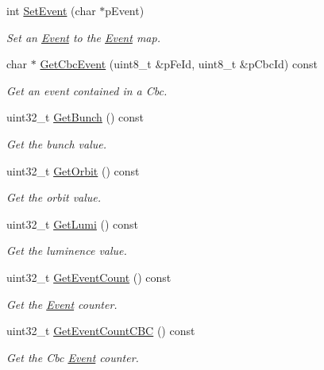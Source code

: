 \begin{DoxyCompactItemize}
int \hyperlink{class_ph2___hw_interface_1_1_event_a67bf8cfaeaec158907932be40b37601d}{Set\-Event} (char $\ast$p\-Event)
\begin{DoxyCompactList}\small\item\em Set an \hyperlink{class_ph2___hw_interface_1_1_event}{Event} to the \hyperlink{class_ph2___hw_interface_1_1_event}{Event} map. \end{DoxyCompactList}\item 
char $\ast$ \hyperlink{class_ph2___hw_interface_1_1_event_a2ee5e2552a84cb78ae902436e0dd77f4}{Get\-Cbc\-Event} (uint8\-\_\-t \&p\-Fe\-Id, uint8\-\_\-t \&p\-Cbc\-Id) const 
\begin{DoxyCompactList}\small\item\em Get an event contained in a Cbc. \end{DoxyCompactList}\item 
uint32\-\_\-t \hyperlink{class_ph2___hw_interface_1_1_event_ab577a18ce8a9edc17debb67ea8734530}{Get\-Bunch} () const 
\begin{DoxyCompactList}\small\item\em Get the bunch value. \end{DoxyCompactList}\item 
uint32\-\_\-t \hyperlink{class_ph2___hw_interface_1_1_event_a02d8bec5f5249cb80e2835e8aff037d7}{Get\-Orbit} () const 
\begin{DoxyCompactList}\small\item\em Get the orbit value. \end{DoxyCompactList}\item 
uint32\-\_\-t \hyperlink{class_ph2___hw_interface_1_1_event_ae5af75e033d2eb6d76a039e859a9ce86}{Get\-Lumi} () const 
\begin{DoxyCompactList}\small\item\em Get the luminence value. \end{DoxyCompactList}\item 
uint32\-\_\-t \hyperlink{class_ph2___hw_interface_1_1_event_aaebf08f816e8a98f424ba8ab25e32231}{Get\-Event\-Count} () const 
\begin{DoxyCompactList}\small\item\em Get the \hyperlink{class_ph2___hw_interface_1_1_event}{Event} counter. \end{DoxyCompactList}\item 
uint32\-\_\-t \hyperlink{class_ph2___hw_interface_1_1_event_a620592c831036eae724c37db45ca0765}{Get\-Event\-Count\-C\-B\-C} () const 
\begin{DoxyCompactList}\small\item\em Get the Cbc \hyperlink{class_ph2___hw_interface_1_1_event}{Event} counter. \end{DoxyCompactList}\item 

\end{DoxyCompactItemize}
